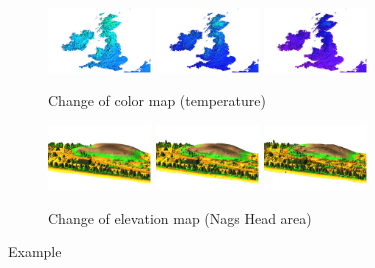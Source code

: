 \documentclass[a4paper,12pt,oneside]{book}
\begin{document}
\begin{figure}[ht]
\centering
    \begin{subfigure}[h]{\textwidth}
    \centering
    \includegraphics[width=0.3\textwidth]{./images/color_map1.png}
    \includegraphics[width=0.3\textwidth]{./images/color_map2.png}
    \includegraphics[width=0.3\textwidth]{./images/color_map3.png}
    \caption{Change of color map (temperature)}
    \label{fig:color_map}
    \end{subfigure}
    
    \begin{subfigure}[h]{\textwidth}
    \centering
    \includegraphics[width=0.3\textwidth]{./images/elevation_map1.png}
    \includegraphics[width=0.3\textwidth]{./images/elevation_map2.png}
    \includegraphics[width=0.3\textwidth]{./images/elevation_map3.png}
    \caption{Change of elevation map (Nags Head area)}
    \label{fig:elevation_map}
    \end{subfigure}
    \caption{Example}
    \label{fig:color_elevation_map}
\end{figure}
\end{document}
